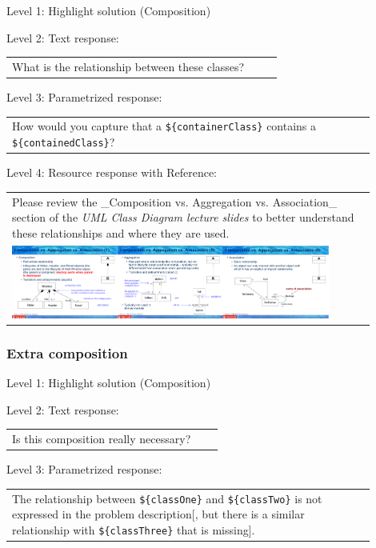 \noindent Level 1: Highlight solution (Composition) \medskip

\noindent Level 2: Text response: \medskip

\begin{tabular}{|p{0.9\linewidth}}
What is the relationship between these classes?
\end{tabular} \medskip

\noindent Level 3: Parametrized response: \medskip

\begin{tabular}{|p{0.9\linewidth}}
How would you capture that a \verb|${containerClass}| contains a \verb|${containedClass}|?
\end{tabular} \medskip

\noindent Level 4: Resource response with Reference: \medskip

\begin{tabular}{|p{0.9\linewidth}}
Please review the _Composition vs. Aggregation vs. Association_ section of 
the \textit{UML Class Diagram lecture slides} to 
better understand these relationships and where they are used.

\\
\includegraphics[width=0.9\textwidth]{images/composition_aggregation_association.png}
\end{tabular} \medskip


\subsubsection{Extra composition}

\noindent Level 1: Highlight solution (Composition) \medskip

\noindent Level 2: Text response: \medskip

\begin{tabular}{|p{0.9\linewidth}}
Is this composition really necessary?
\end{tabular} \medskip

\noindent Level 3: Parametrized response: \medskip

\begin{tabular}{|p{0.9\linewidth}}
The relationship between \verb|${classOne}| and \verb|${classTwo}| is not expressed in the problem description[, but there is a similar relationship with \verb|${classThree}| that is missing].
\end{tabular} \medskip

